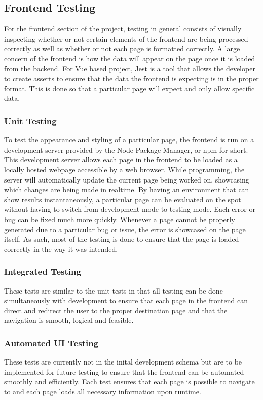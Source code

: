 {{{\subsection{Frontend Testing}
For the frontend section of the project, testing in general consists of visually inspecting whether or not certain elements of the frontend are being processed correctly as well as whether or not each page is formatted correctly. A large concern of the frontend is how the data will appear on the page once it is loaded from the backend. For Vue based project, Jest is a tool that allows the developer to create asserts to ensure that the data the frontend is expecting is in the proper format. This is done so that a particular page will expect and only allow specific data. 

\subsubsection{Unit Testing}
To test the appearance and styling of a particular page, the frontend is run on a development server provided by the Node Package Manager, or npm for short. This development server allows each page in the frontend to be loaded as a locally hosted webpage accessible by a web browser. While programming, the server will automatically update the current page being worked on, showcasing which changes are being made in realtime. By having an environment that can show results instantaneously, a particular page can be evaluated on the spot without having to switch from development mode to testing mode. Each error or bug can be fixed much more quickly. Whenever a page cannot be properly generated due to a particular bug or issue, the error is showcased on the page itself. As such, most of the testing is done to ensure that the page is loaded correctly in the way it was intended. 

\subsubsection{Integrated Testing}
These tests are similar to the unit tests in that all testing can be done simultaneously with development to ensure that each page in the frontend can direct and redirect the user to the proper destination page and that the navigation is smooth, logical and feasible.  

\subsubsection{Automated UI Testing}
These tests are currently not in the inital development schema but are to be implemented for future testing to ensure that the frontend can be automated smoothly and efficiently. Each test ensures that each page is possible to navigate to and each page loads all necessary information upon runtime.


}}}

